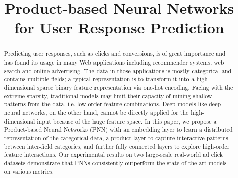 \documentclass[conference]{IEEEtran}
\begin{document}
\title{Product-based Neural Networks for User Response Prediction}


\author{
\and
{}
}


\maketitle

\begin{abstract}
Predicting user responses, such as clicks and conversions, is of great importance and has found its usage in many Web applications including recommender systems, web search and online advertising. The data in those applications is mostly categorical and contains multiple fields; a typical representation is to transform it into a high-dimensional sparse binary feature representation via one-hot encoding.
Facing with the extreme sparsity, traditional models may limit their capacity of mining shallow patterns from the data, i.e. low-order feature combinations. Deep models like deep neural networks, on the other hand, cannot be directly applied for the high-dimensional input because of the huge feature space.
In this paper, we propose a Product-based Neural Networks (PNN) with an embedding layer to learn a distributed representation of the categorical data, a product layer to capture interactive patterns between inter-field categories, and further fully connected layers to explore high-order feature interactions.
Our experimental results on two large-scale real-world ad click datasets demonstrate that PNNs consistently outperform the state-of-the-art models on various metrics.
\end{abstract}

\end{document}
